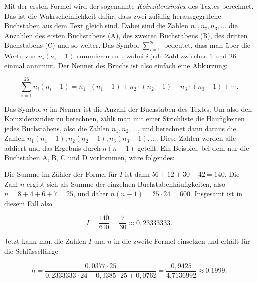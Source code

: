 \documentclass{zusammenfassung}
\begin{document}
Mit der ersten Formel wird der sogenannte \emph{Koinzidenzindex} des Textes berechnet. Das ist die Wahrscheinlichkeit dafür, dass
zwei zufällig herausgegriffene Buchstaben aus dem Text gleich sind. Dabei sind die Zahlen $n_1,n_2,n_3,\ldots$ die Anzahlen des
ersten Buchstabens (A), des zweiten Buchstabens (B), des dritten Buchstabens (C) und so weiter. Das Symbol $\sum_{i=1}^{26}$
bedeutet, dass man über die Werte von $n_i(n_i-1)$ summieren soll, wobei $i$ jede Zahl zwischen $1$ und $26$ einmal annimmt. Der
Nenner des Bruchs ist also einfach eine Abkürzung:

\[
  \sum_{i=1}^{26}n_i(n_i-1)=n_1\cdot(n_1-1)+n_2\cdot(n_2-1)+n_3\cdot(n_3-1)+\cdots.
\]

Das Symbol $n$ im Nenner ist die Anzahl der Buchstaben des Textes. Um also den Koinzidenzindex zu berechnen, zählt man mit einer
Strichliste die Häufigkeiten jedes Buchstabens, also die Zahlen $n_1,n_2,\ldots$, und berechnet dann daraus die Zahlen
$n_1(n_1-1),n_2(n_2-1),n_3(n_3-1),\ldots$. Diese Zahlen werden alle addiert und das Ergebnis durch $n(n-1)$ geteilt. Ein Beispiel,
bei dem nur die Buchstaben A, B, C und D vorkommen, wäre folgendes:

\begin{center}
\end{center}

Die Summe im Zähler der Formel für $I$ ist dann $56+12+30+42=140$. Die Zahl $n$ ergibt sich als Summe der einzelnen
Buchstabenhäufigkeiten, also $n=8+4+6+7=25$, und daher $n(n-1)=25\cdot 24=600$. Insgesamt ist in diesem Fall also

\[
  I=\frac{140}{600}=\frac{7}{30}\approx 0{,}23333333.
\]

Jetzt kann man die Zahlen $I$ und $n$ in die zweite Formel einsetzen und erhält für die Schlüssellänge

\[
  h=\frac{0{,}0377\cdot 25}{0{,}2333333\cdot 24-0{,}0385\cdot 25+0{,}0762}=\frac{0{,}9425}{4.7136992}\approx 0.1999.
\]
\end{document}
